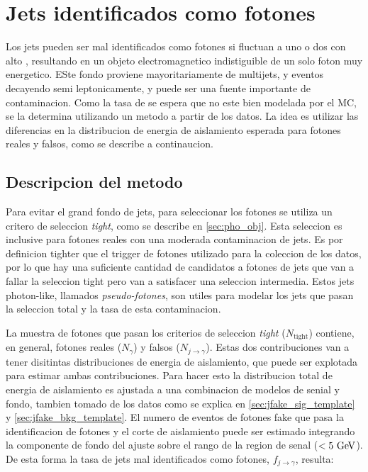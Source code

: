 \section{Jets identificados como fotones} \label{sec:jetfakes}

Los jets pueden ser mal identificados como fotones si fluctuan a uno o dos
{\pizero} con alto \pt, resultando en un objeto electromagnetico indistiguible
de un solo foton muy energetico.
ESte fondo proviene mayoritariamente de multijets, {\wjets} y eventos {\ttbar} decayendo
semi leptonicamente, y puede ser una fuente importante de contaminacion.
Como la tasa de {\misid} se espera que no este bien modelada por el MC, se la determina
utilizando un metodo a partir de los datos. La idea es utilizar las diferencias en la
distribucion de energia de aislamiento esperada para fotones reales y falsos, como
se describe a continaucion.

\subsection{Descripcion del metodo}\label{sec:jetfake_method}

Para evitar el grand fondo de jets, para seleccionar los fotones se utiliza un
critero de seleccion \emph{tight}, como se describe en \ref{sec:pho_obj}.
Esta seleccion es inclusive para fotones reales con una moderada contaminacion
de jets. Es por definicion tighter que el trigger de fotones utilizado para
la coleccion de los datos, por lo que hay una suficiente cantidad de candidatos
a fotones de jets que van a fallar la seleccion tight pero van a satisfacer una
seleccion intermedia. Estos jets photon-like, llamados \emph{pseudo-fotones},
son utiles para modelar los jets que pasan la seleccion total y la tasa de esta
contaminacion.

La muestra de fotones que pasan los criterios de seleccion \emph{tight} ($N_\text{tight}$)
contiene, en general, fotones reales ($N_{\gamma}$) y falsos ($N_{j\to\gamma}$).
Estas dos contribuciones van a tener disitintas distribuciones de energia de aislamiento,
que puede ser explotada para estimar ambas contribuciones. Para hacer esto la distribucion
total de energia de aislamiento es ajustada a una combinacion de modelos de senial y fondo,
tambien tomado de los datos como se explica en \ref{sec:jfake_sig_template} y \ref{sec:jfake_bkg_template}.
El numero de eventos de fotones fake que pasa la identificacion de fotones y el corte de
aislamiento puede ser estimado integrando la componente de fondo del ajuste sobre el rango
de la region de senal ($<5\GeV$). De esta forma la tasa de jets mal identificados como fotones,
$f_{j\to \gamma}$, resulta:

